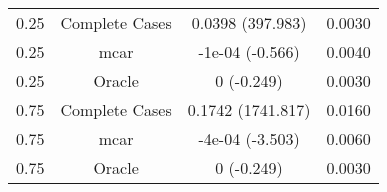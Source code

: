 \begin{table}[ht]
\centering
\begin{tabular}{cccc}
  \hline
  \hline
0.25 & Complete Cases & 0.0398 (397.983) & 0.0030 \\ 
  0.25 & mcar & -1e-04 (-0.566) & 0.0040 \\ 
  0.25 & Oracle & 0 (-0.249) & 0.0030 \\ 
  0.75 & Complete Cases & 0.1742 (1741.817) & 0.0160 \\ 
  0.75 & mcar & -4e-04 (-3.503) & 0.0060 \\ 
  0.75 & Oracle & 0 (-0.249) & 0.0030 \\ 
   \hline
\end{tabular}
\end{table}
